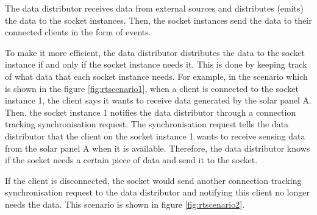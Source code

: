 \documentclass[../thesis.tex]{subfiles}
\begin{document}
The data distributor receives data from external sources and distributes (emits) the data to the socket instances. Then, the socket instances send the data to their connected clients in the form of events.

To make it more efficient, the data distributor distributes the data to the socket instance if and only if the socket instance needs it. This is done by keeping track of what data that each socket instance needs. For example, in the scenario which is shown in the figure \ref{fig:rtscenario1}, when a client is connected to the socket instance 1, the client says it wants to receive data generated by the solar panel A. Then, the socket instance 1 notifies the data distributor through a connection tracking synchronisation request. The synchronisation request tells the data distributor that the client on the socket instance 1 wants to receive sensing data from the solar panel A when it is available. Therefore, the data distributor knows if the socket needs a certain piece of data and send it to the socket.

If the client is disconnected, the socket would send another connection tracking synchronisation request to the data distributor and notifying this client no longer needs the data. This scenario is shown in figure \ref{fig:rtscenario2}.
\end{document}
